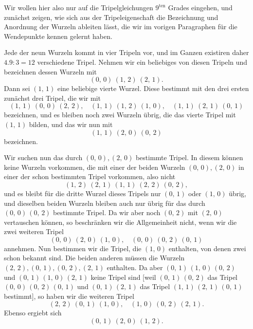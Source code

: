 
Wir wollen hier also nur auf die Tripelgleichungen $9^{\text{ten}}$ Grades
eingehen, und zunächst zeigen, wie sich aus der Tripeleigenschaft
die Bezeichnung und Anordnung der Wurzeln ableiten lässt, die
wir im vorigen Paragraphen für die Wendepunkte kennen gelernt
haben.

Jede der neun Wurzeln kommt in vier Tripeln vor, und im
Ganzen existiren daher $4.9:3=12$ verschiedene Tripel. Nehmen
wir ein beliebiges von diesen Tripeln und bezeichnen dessen
Wurzeln mit
\[
(0,\,0)\ (1,\,2)\ (2,\,1).
\]
Dann sei $(1,\,1)$ eine beliebige vierte Wurzel. Diese bestimmt
mit den drei ersten zunächst drei Tripel, die wir mit
\[
(1,\,1)\ (0,\,0)\ (2,\,2), \quad (1,\,1)\ (1,\,2)\ (1,\,0), \quad (1,\,1)\ (2,\,1)\ (0,\,1)
\]
bezeichnen, und es bleiben noch zwei Wurzeln übrig, die das
vierte Tripel mit $(1,\,1)$ bilden, und das wir nun mit
\[
(1,\,1)\ (2,\,0)\ (0,\,2)
\]
bezeichnen.

Wir suchen nun das durch $(0,\,0), (2,\,0)$ bestimmte Tripel.
In diesem können keine Wurzeln vorkommen, die mit einer der
beiden Wurzeln $(0,\,0), (2,\,0)$ in einer der schon bestimmten Tripel %
vorkommen, also nicht
\[
(1,\,2)\ (2,\,1)\ (1,\,1)\ (2,\,2)\ (0,\,2),
\]
und es bleibt für die dritte Wurzel dieses Tripels nur $(0,\,1)$
oder $(1,\,0)$ übrig, und dieselben beiden Wurzeln bleiben auch nur
übrig für das durch $(0,\,0)\,(0,\,2)$ bestimmte Tripel. Da wir aber
noch $(0,\,2)$ mit $(2,\,0)$ vertauschen können, so beschränken wir
die Allgemeinheit nicht, wenn wir die zwei weiteren Tripel
\[
(0,\,0)\ (2,\,0)\ (1,\,0), \quad (0,\,0)\ (0,\,2)\ (0,\,1)
\]
annehmen. Nun bestimmen wir die Tripel, die $(1,\,0)$ enthalten,
von denen zwei schon bekannt sind. Die beiden anderen
müssen die Wurzeln $(2,\,2), (0,\,1), (0,\,2), (2,\,1)$ enthalten. Da aber
$(0,\,1)\,(1,\,0)\,(0,\,2)$ und $(0,\,1)\,(1,\,0)\,(2,\,1)$ keine Tripel sind [weil
$(0,\,1)\,(0,\,2)$ das Tripel $(0,\,0)\,(0,\,2)\,(0,\,1)$ und $(0,\,1)\,(2,\,1)$ das
Tripel $(1,\,1)\,(2,\,1)\,(0,\,1)$ bestimmt], so haben wir die weiteren
Tripel
\[
(2,\,2)\ (0,\,1)\ (1,\,0), \quad (1,\,0)\ (0,\,2)\ (2,\,1).
\]
Ebenso ergiebt sich
\[
(0,\,1)\ (2,\,0)\ (1,\,2).
\]
